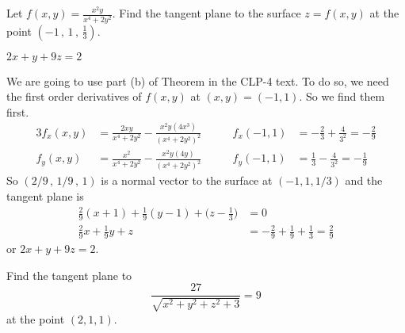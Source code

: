 \subsection*{\Procedural}

\begin{question}[M200 2009A] %
Let $\displaystyle f(x,y)=\frac{x^2y}{x^4+2y^2}$.
Find the tangent plane to the surface $z = f(x,y)$ at the point
$\left( -1\,,\,1\,,\,\frac{1}{3}\right)$.
\end{question}

%

\begin{answer}
$2x+y+9z=2$
\end{answer}

\begin{solution}
We are going to use part (b) of Theorem  
in the CLP-4 text. To do so, we need the first order derivatives of $f(x,y)$ 
at $(x,y)=(-1,1)$. So we find them first.
\begin{alignat*}{3}
f_x(x,y)&=\frac{2xy}{x^4+2y^2}-\frac{x^2y(4x^3)}{{(x^4+2y^2)}^2}\qquad &
f_x(-1,1)&=-\frac{2}{3} +\frac{4}{3^2}=-\frac{2}{9}
\\
f_y(x,y)&=\frac{x^2}{x^4+2y^2}-\frac{x^2y(4y)}{{(x^4+2y^2)}^2}\qquad &
f_y(-1,1)&=\frac{1}{3} -\frac{4}{3^2}=-\frac{1}{9}
\end{alignat*}
So $(2/9\,,\,1/9\,,\,1)$ is a normal vector to the surface at 
$(-1,1,1/3)$ and the tangent plane is
\begin{align*}
\frac{2}{9}(x+1) +\frac{1}{9}(y-1) +\Big(z-\frac{1}{3}\Big) &=0 \\
\frac{2}{9}x +\frac{1}{9}y + z &=-\frac{2}{9}+\frac{1}{9}+\frac{1}{3}
           =\frac{2}{9}  
\end{align*}
or $2x+y+9z=2$.
\end{solution}

\begin{question}[M200 2015D] %
Find the tangent plane to
\begin{equation*}
\frac{27}{\sqrt{x^2+y^2+z^2+3}}=9
\end{equation*}
at the point $(2, 1, 1)$.
\end{question}

%

